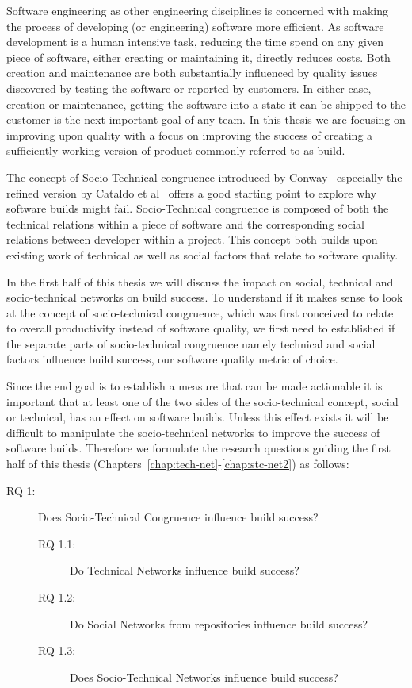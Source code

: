 Software engineering as other engineering disciplines is concerned with making the process of developing (or engineering) software more efficient.
As software development is a human intensive task, reducing the time spend on any given piece of software, either creating or maintaining it, directly reduces costs.
Both creation and maintenance are both substantially influenced by quality issues discovered by testing the software or reported by customers.
In either case, creation or maintenance, getting the software into a state it can be shipped to the customer is the next important goal of any team.
In this thesis we are focusing on improving upon quality with a focus on improving the success of creating a sufficiently working version of product commonly referred to as build.

The concept of Socio-Technical congruence introduced by Conway~\cite{conway:datamination:1968} especially the refined version by Cataldo et al~\cite{cataldo:cscw:2006} offers a good starting point to explore why software builds might fail.
Socio-Technical congruence is composed of both the technical relations within a piece of software and the corresponding social relations between developer within a project.
This concept both builds upon existing work of technical as well as social factors that relate to software quality.

In the first half of this thesis we will discuss the impact on social, technical and socio-technical networks on build success.
To understand if it makes sense to look at the concept of socio-technical congruence, which was first conceived to relate to overall productivity instead of software quality, we first need to established if the separate parts of socio-technical congruence namely technical and social factors influence build success, our software quality metric of choice.

Since the end goal is to establish a measure that can be made actionable it is important that at least one of the two sides of the socio-technical concept, social or technical, has an effect on software builds.
Unless this effect exists it will be difficult to manipulate the socio-technical networks to improve the success of software builds.
Therefore we formulate the research questions guiding the first half of this thesis (Chapters~\ref{chap:tech-net}-\ref{chap:stc-net2}) as follows:

\begin{description}
% 
\item[RQ 1:] Does Socio-Technical Congruence influence build success?
  \begin{description}
  \item[RQ 1.1:] Do Technical Networks influence build success?
  \item[RQ 1.2:] Do Social Networks from repositories influence build success?
  \item[RQ 1.3:] Does Socio-Technical Networks influence build success?
  \end{description}
%
\end{description}

